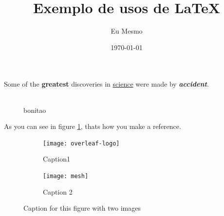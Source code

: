 \documentclass[12pt]{article}
\title{Exemplo de usos de LaTeX}
\author{Eu Mesmo}
\date{\today}
\begin{document}
\maketitle


Some of the \textbf{greatest}
discoveries in \underline{science} 
were made by \textbf{\textit{accident}}.




\begin{figure}[h] %
    \centering
    \includegraphics[width = 0.8]{derivadas.pdf}
    \caption{bonitao}
    \label{fig:derivadas}
\end{figure}
As you can see in figure \ref{fig:derivadas}, thats how you make a reference.

\begin{figure}[h]

\begin{subfigure}{0.5\textwidth}
\texttt{[image: overleaf-logo]} 
\caption{Caption1}
\label{fig:subim1}
\end{subfigure}

\begin{subfigure}{0.5\textwidth}
\texttt{[image: mesh]}
\caption{Caption 2}
\label{fig:subim2}
\end{subfigure}

\caption{Caption for this figure with two images}
\label{fig:image2}
\end{figure}
\end{document}
